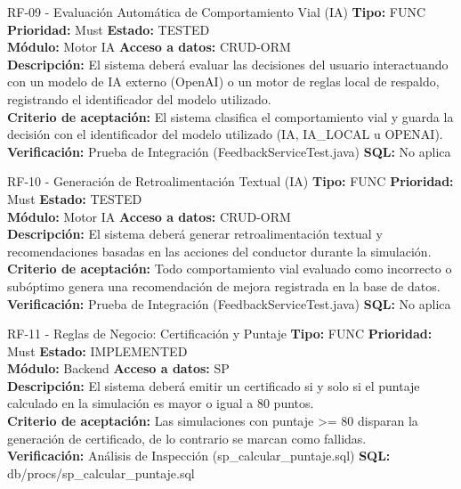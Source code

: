 \documentclass[11pt,a4paper]{article}
\begin{document}
\begin{requisito}{RF-09 - Evaluación Automática de Comportamiento Vial (IA)}
    \textbf{Tipo:} FUNC \quad \textbf{Prioridad:} Must \quad \textbf{Estado:} TESTED \\[0.2cm]
    \textbf{Módulo:} Motor IA \quad \textbf{Acceso a datos:} CRUD-ORM \\[0.2cm]
    \textbf{Descripción:} El sistema deberá evaluar las decisiones del usuario interactuando con un modelo de IA externo (OpenAI) o un motor de reglas local de respaldo, registrando el identificador del modelo utilizado. \\[0.2cm]
    \textbf{Criterio de aceptación:} El sistema clasifica el comportamiento vial y guarda la decisión con el identificador del modelo utilizado (IA, IA\_LOCAL u OPENAI). \\[0.2cm]
    \textbf{Verificación:} Prueba de Integración (FeedbackServiceTest.java) \quad \textbf{SQL:} No aplica
\end{requisito}

\begin{requisito}{RF-10 - Generación de Retroalimentación Textual (IA)}
    \textbf{Tipo:} FUNC \quad \textbf{Prioridad:} Must \quad \textbf{Estado:} TESTED \\[0.2cm]
    \textbf{Módulo:} Motor IA \quad \textbf{Acceso a datos:} CRUD-ORM \\[0.2cm]
    \textbf{Descripción:} El sistema deberá generar retroalimentación textual y recomendaciones basadas en las acciones del conductor durante la simulación. \\[0.2cm]
    \textbf{Criterio de aceptación:} Todo comportamiento vial evaluado como incorrecto o subóptimo genera una recomendación de mejora registrada en la base de datos. \\[0.2cm]
    \textbf{Verificación:} Prueba de Integración (FeedbackServiceTest.java) \quad \textbf{SQL:} No aplica
\end{requisito}

\begin{requisito}{RF-11 - Reglas de Negocio: Certificación y Puntaje}
    \textbf{Tipo:} FUNC \quad \textbf{Prioridad:} Must \quad \textbf{Estado:} IMPLEMENTED \\[0.2cm]
    \textbf{Módulo:} Backend \quad \textbf{Acceso a datos:} SP \\[0.2cm]
    \textbf{Descripción:} El sistema deberá emitir un certificado si y solo si el puntaje calculado en la simulación es mayor o igual a 80 puntos. \\[0.2cm]
    \textbf{Criterio de aceptación:} Las simulaciones con puntaje >= 80 disparan la generación de certificado, de lo contrario se marcan como fallidas. \\[0.2cm]
    \textbf{Verificación:} Análisis de Inspección (sp\_calcular\_puntaje.sql) \quad \textbf{SQL:} db/procs/sp\_calcular\_puntaje.sql
\end{requisito}
\end{document}
